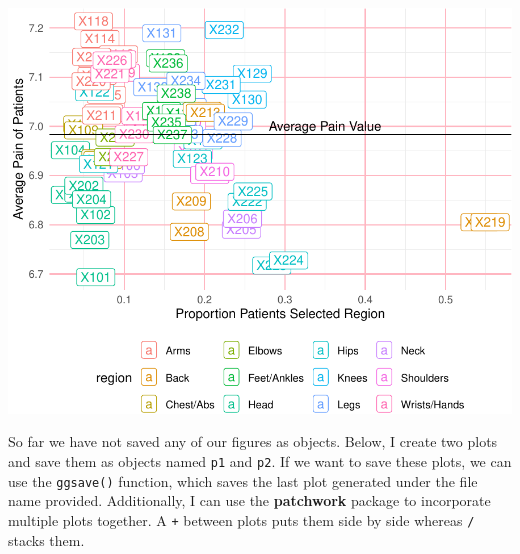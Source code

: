 \documentclass[
  letterpaper,
]{krantz}
\begin{document}
\begin{center}
\includegraphics[width=1\textwidth,height=\textheight]{book/visualization_ggplot_files/figure-pdf/unnamed-chunk-22-1.pdf}
\end{center}

So far we have not saved any of our figures as objects. Below, I create
two plots and save them as objects named \texttt{p1} and \texttt{p2}. If
we want to save these plots, we can use the \texttt{ggsave()} function,
which saves the last plot generated under the file name provided.
Additionally, I can use the \textbf{patchwork} package to incorporate
multiple plots together. A \texttt{+} between plots puts them side by
side whereas \texttt{/} stacks them.
\end{document}
